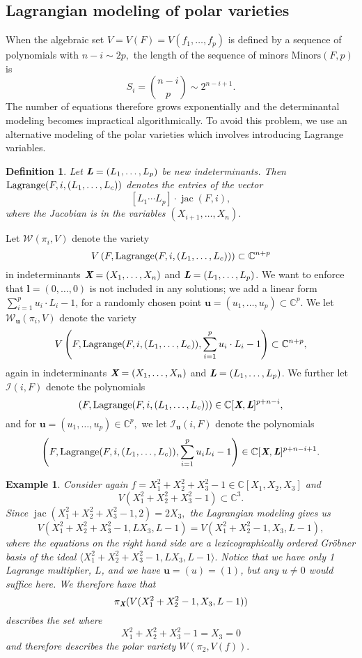 \documentclass[a4paper]{article}
\def\sW{\mathscr{W}}
\def\sI{\mathscr{I}}
\def\Lb{\textit{\textbf{L}}}
\def\Xb{\textit{\textbf{X}}}
\def\ub{{\bm u}}
\def\lb{{\bm l}}
\DeclareMathOperator{\jac}{jac}
\def\minors{\textrm{Minors}(F,p)}
\DeclareMathOperator{\lag}{Lagrange}
\def\C{\mathbb{C}}
\def\lagF{{\bm\lag}(F,i,(L_1,\hdots,L_c))}
\def\Iil{\mathscr{I}_{\ub}(i,F)}
\def\Wil{\mathscr{W}_{\ub}(\pi_i,V)}
\def\la{\langle}
\def\ra{\rangle}
\newtheorem{ex}[theorem]{Example}
\newtheorem{definition}[theorem]{Definition}
\begin{document}
\subsection{Lagrangian modeling of polar varieties} 
%
When the algebraic set $V=V(F)=V(f_1,\hdots,f_p)$ is defined by a sequence of polynomials with $n-i \sim 2p,$ the length of the sequence of minors $\minors$ is \[S_i = \binom{n-i}{p}\sim 2^{n-i+1}.\] 
The number of equations therefore grows exponentially and the determinantal modeling becomes impractical algorithmically. To avoid this problem, we use an alternative modeling of the polar varieties which involves introducing Lagrange variables. %
\begin{definition}
Let $\Lb = (L_1,\hdots,L_p)$ be new indeterminants. Then $\lagF$ denotes the entries of the vector
\[
[L_1\cdots L_p]\cdot \jac (F,i),
\] 
where the Jacobian is in the variables $(X_{i+1},\hdots,X_n).$
\end{definition}
%
\noindent 
Let $\sW(\pi_i,V)$ denote the variety
\[
V\left(F, \lagF\right) \subset \C^{n+p} 
\]
in indeterminants $\Xb=(X_1,\hdots,X_n)$ and $\Lb=(L_1,\hdots,L_p)$. We want to enforce that $\lb = (0,\hdots,0)$ is not included in any solutions; we add a linear form $\sum_{i=1}^pu_i\cdot L_i-1$, for a randomly chosen point $\ub = (u_1,\hdots,u_p) \subset \C^p.$ We let $\Wil$ denote the variety
\[
V\left(F, \lagF,\sum_{i=1}^pu_i\cdot L_i-1\right) \subset \C^{n+p},
\]
again in indeterminants $\Xb=(X_1,\hdots,X_n)$ and $\Lb=(L_1,\hdots,L_p)$. We further let $\sI(i,F)$
denote the polynomials 
\[
\left(F, \lagF \right) \in \C[\Xb,\Lb]^{p+n-i},
\]
and for $\ub = (u_1,\hdots,u_p) \in \C^p,$ we let $\Iil$ denote the polynomials
\[
\left(F, \lagF,\sum_{i=1}^pu_iL_i-1 \right)\in \C[\Xb,\Lb]^{p+n-i+1}.
\]
%
%
%
\begin{ex}
Consider again $f=X_1^2 + X_2^2 + X_3^2-1 \in \C[X_1,X_2,X_3]$ and 
\[V(X_1^2 + X_2^2 + X_3^2-1)\subset \C^3.\]
Since $\jac(X_1^2 + X_2^2 + X_3^2-1,2)=2X_3,$ the Lagrangian modeling gives us 
\[
 V(X_1^2 + X_2^2 + X_3^2-1, LX_3, L-1) = V(X_1^2 + X_2^2-1,X_3,L-1),
\]
where the equations on the right hand side are a lexicographically ordered Gr\"obner basis of the ideal $\la X_1^2 + X_2^2 + X_3^2-1, LX_3, L-1 \ra.$ 
Notice that we have only 1 Lagrange multiplier, $L$,  and we have $\ub=(u)=(1)$, but any $u \not = 0$ would suffice here. We therefore have that \[ \pi_{\Xb}(V(X_1^2 + X_2^2-1,X_3,L-1))\] describes the set where 
\[ X_1^2 + X_2^2 + X_3^2-1 = X_3 = 0\] and therefore describes the polar variety $W(\pi_2,V(f)).$
%
\end{ex}
\end{document}
